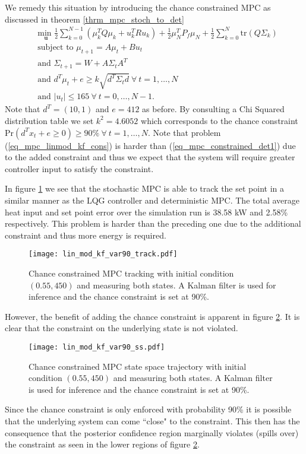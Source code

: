 We remedy this situation by introducing the chance constrained MPC as discussed in theorem \ref{thrm_mpc_stoch_to_det}
\begin{equation}
\begin{aligned}
&\underset{\mathbf{u}}{\text{min }} \frac{1}{2}\sum_{k=0}^{N-1} \left( \mu_k^TQ\mu_k + u_k^TRu_k \right) + \frac{1}{2}\mu_N^TP_f\mu_N + \frac{1}{2}\sum_{k=0}^N \text{tr}(Q\Sigma_k) \\
& \text{subject to } \mu_{t+1}=A\mu_t + Bu_t \\
& \text{and } \Sigma_{t+1} = W+A\Sigma_t A^T \\
& \text{and } d^T\mu_t + e \geq k\sqrt{d^T \Sigma_t d} ~\forall ~t=1,\hdots,N\\
& \text{and } |u_t| \leq 165 ~\forall ~t=0,\hdots,N-1.
\end{aligned}
\label{eq_mpc_linmod_kf_cons}
\end{equation}
Note that $d^T = (10, 1)$ and $e=412$ as before. By consulting a Chi Squared distribution table we set $k^2 = 4.6052$ which corresponds to the chance constraint $\text{Pr}(d^Tx_t + e \geq 0) \geq 90\% ~\forall ~t=1,\hdots,N$. Note that problem (\ref{eq_mpc_linmod_kf_cons}) is harder than (\ref{eq_mpc_constrained_det1}) due to the added constraint and thus we expect that the system will require greater controller input to satisfy the constraint. 

In figure \ref{fig_lin_mod_kf_var90_track} we see that the stochastic MPC is able to track the set point in a similar manner as the LQG controller and deterministic MPC. The total average heat input and set point error over the simulation run is  38.58 kW and 2.58\% respectively. This problem is harder than the preceding one due to the additional constraint and thus more energy is required. 
\begin{figure}[H] 
\centering
\texttt{[image: lin\_mod\_kf\_var90\_track.pdf]}
\caption{Chance constrained MPC tracking with initial condition $(0.55, 450)$ and measuring both states. A Kalman filter is used for inference and the chance constraint is set at 90\%.}
\label{fig_lin_mod_kf_var90_track}
\end{figure}
However, the benefit of adding the chance constraint is apparent in figure \ref{fig_lin_mod_kf_var90_ss}. It is clear that the constraint on the underlying state is not violated.
\begin{figure}[H] 
\centering
\texttt{[image: lin\_mod\_kf\_var90\_ss.pdf]}
\caption{Chance constrained MPC state space trajectory with initial condition $(0.55, 450)$ and measuring both states. A Kalman filter is used for inference and the chance constraint is set at 90\%.}
\label{fig_lin_mod_kf_var90_ss}
\end{figure}
Since the chance constraint is only enforced with probability 90\% it is possible that the underlying system can come ``close" to the constraint. This then has the consequence that the posterior confidence region marginally violates (spills over) the constraint as seen in the lower regions of figure \ref{fig_lin_mod_kf_var90_ss}.
 

